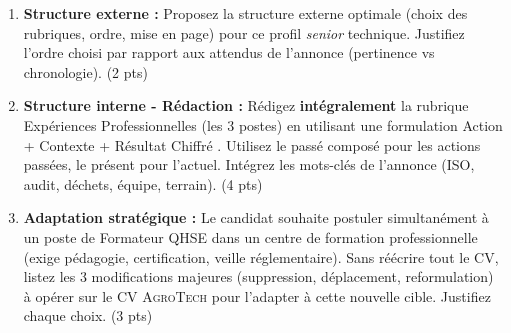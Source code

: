 \documentclass[11pt]{article}
\begin{document}
\begin{exercice}
\begin{enumerate}
    \item \textbf{Structure externe :} Proposez la structure externe optimale (choix des rubriques, ordre, mise en page) pour ce profil \textit{senior} technique. Justifiez l'ordre choisi par rapport aux attendus de l'annonce (pertinence vs chronologie). (2 pts)
    \item \textbf{Structure interne - Rédaction :} Rédigez \textbf{intégralement} la rubrique \og Expériences Professionnelles \fg{} (les 3 postes) en utilisant une formulation \og Action + Contexte + Résultat Chiffré \fg{}. Utilisez le passé composé pour les actions passées, le présent pour l'actuel. Intégrez les mots-clés de l'annonce (ISO, audit, déchets, équipe, terrain). (4 pts)
    \item \textbf{Adaptation stratégique :} Le candidat souhaite postuler simultanément à un poste de \og Formateur QHSE \fg{} dans un centre de formation professionnelle (exige pédagogie, certification, veille réglementaire). Sans réécrire tout le CV, listez les 3 modifications majeures (suppression, déplacement, reformulation) à opérer sur le CV \textsc{AgroTech} pour l'adapter à cette nouvelle cible. Justifiez chaque choix. (3 pts)
\end{enumerate}
\end{exercice}
\end{document}
